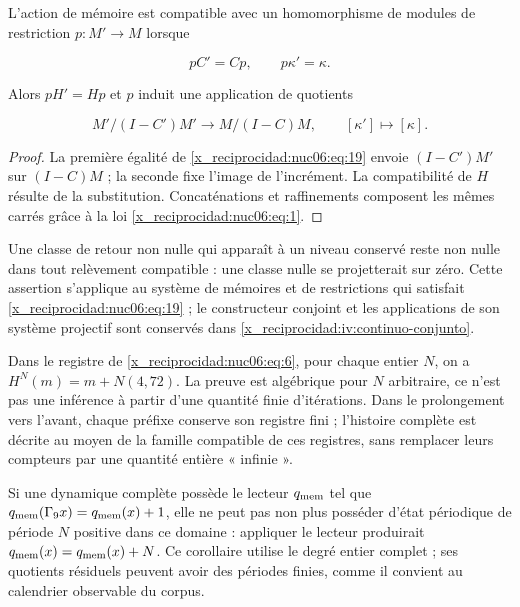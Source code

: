 L’action de mémoire est compatible avec un homomorphisme de modules de restriction \(p:M'\to M\) lorsque

\begin{equation}
pC'=Cp,\qquad p\kappa'=\kappa.
\label{x_reciprocidad:nuc06:eq:19}
\end{equation}

Alors \(pH'=Hp\) et \(p\) induit une application de quotients

\begin{equation}
M'/(I-C')M'\longrightarrow M/(I-C)M,
\qquad [\kappa']\longmapsto[\kappa].
\label{x_reciprocidad:nuc06:eq:20}
\end{equation}

\begin{proof}
La première égalité de \eqref{x_reciprocidad:nuc06:eq:19} envoie \((I-C')M'\) sur \((I-C)M\) ; la seconde fixe l’image de l’incrément. La compatibilité de \(H\) résulte de la substitution. Concaténations et raffinements composent les mêmes carrés grâce à la loi \eqref{x_reciprocidad:nuc06:eq:1}.
\end{proof}

Une classe de retour non nulle qui apparaît à un niveau conservé reste non nulle dans tout relèvement compatible : une classe nulle se projetterait sur zéro. Cette assertion s’applique au système de mémoires et de restrictions qui satisfait \eqref{x_reciprocidad:nuc06:eq:19} ; le constructeur conjoint et les applications de son système projectif sont conservés dans \cref{x_reciprocidad:iv:continuo-conjunto}.

Dans le registre de \eqref{x_reciprocidad:nuc06:eq:6}, pour chaque entier \(N\), on a \(H^N(m)=m+N(4,72)\). La preuve est algébrique pour \(N\) arbitraire, ce n’est pas une inférence à partir d’une quantité finie d’itérations. Dans le prolongement vers l’avant, chaque préfixe conserve son registre fini ; l’histoire complète est décrite au moyen de la famille compatible de ces registres, sans remplacer leurs compteurs par une quantité entière « infinie ».

Si une dynamique complète possède le lecteur \(q_{\rm mem}\) tel que \(q_{\rm mem}(\Gamma_9x)=q_{\rm mem}(x)+1\), elle ne peut pas non plus posséder d’état périodique de période \(N\) positive dans ce domaine : appliquer le lecteur produirait \(q_{\rm mem}(x)=q_{\rm mem}(x)+N\). Ce corollaire utilise le degré entier complet ; ses quotients résiduels peuvent avoir des périodes finies, comme il convient au calendrier observable du corpus.

